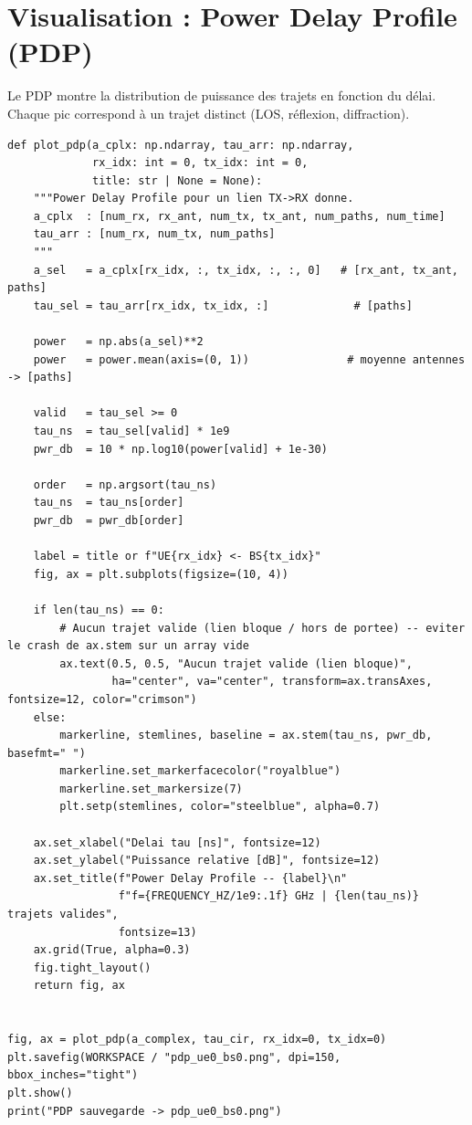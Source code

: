 \documentclass[11pt,a4paper]{article}
\begin{document}
\section{Visualisation : Power Delay Profile (PDP)}

Le PDP montre la distribution de puissance des trajets en fonction du délai. Chaque pic correspond à un trajet distinct (LOS, réflexion, diffraction).

\begin{lstlisting}
def plot_pdp(a_cplx: np.ndarray, tau_arr: np.ndarray,
             rx_idx: int = 0, tx_idx: int = 0,
             title: str | None = None):
    """Power Delay Profile pour un lien TX->RX donne.
    a_cplx  : [num_rx, rx_ant, num_tx, tx_ant, num_paths, num_time]
    tau_arr : [num_rx, num_tx, num_paths]
    """
    a_sel   = a_cplx[rx_idx, :, tx_idx, :, :, 0]   # [rx_ant, tx_ant, paths]
    tau_sel = tau_arr[rx_idx, tx_idx, :]             # [paths]

    power   = np.abs(a_sel)**2
    power   = power.mean(axis=(0, 1))               # moyenne antennes -> [paths]

    valid   = tau_sel >= 0
    tau_ns  = tau_sel[valid] * 1e9
    pwr_db  = 10 * np.log10(power[valid] + 1e-30)

    order   = np.argsort(tau_ns)
    tau_ns  = tau_ns[order]
    pwr_db  = pwr_db[order]

    label = title or f"UE{rx_idx} <- BS{tx_idx}"
    fig, ax = plt.subplots(figsize=(10, 4))

    if len(tau_ns) == 0:
        # Aucun trajet valide (lien bloque / hors de portee) -- eviter le crash de ax.stem sur un array vide
        ax.text(0.5, 0.5, "Aucun trajet valide (lien bloque)",
                ha="center", va="center", transform=ax.transAxes, fontsize=12, color="crimson")
    else:
        markerline, stemlines, baseline = ax.stem(tau_ns, pwr_db, basefmt=" ")
        markerline.set_markerfacecolor("royalblue")
        markerline.set_markersize(7)
        plt.setp(stemlines, color="steelblue", alpha=0.7)

    ax.set_xlabel("Delai tau [ns]", fontsize=12)
    ax.set_ylabel("Puissance relative [dB]", fontsize=12)
    ax.set_title(f"Power Delay Profile -- {label}\n"
                 f"f={FREQUENCY_HZ/1e9:.1f} GHz | {len(tau_ns)} trajets valides",
                 fontsize=13)
    ax.grid(True, alpha=0.3)
    fig.tight_layout()
    return fig, ax


fig, ax = plot_pdp(a_complex, tau_cir, rx_idx=0, tx_idx=0)
plt.savefig(WORKSPACE / "pdp_ue0_bs0.png", dpi=150, bbox_inches="tight")
plt.show()
print("PDP sauvegarde -> pdp_ue0_bs0.png")
\end{lstlisting}
\end{document}
